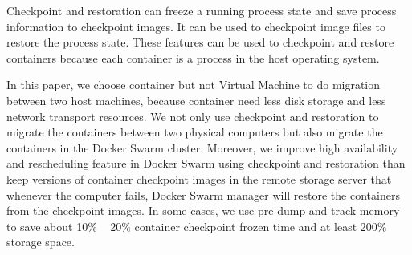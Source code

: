 Checkpoint and restoration can freeze a running process state and save process information to checkpoint images. It can be used to checkpoint image files to restore the process state. These features can be used to checkpoint and restore containers because each container is a process in the host operating system.

In this paper, we choose container but not Virtual Machine to do migration between two host machines, because container need less disk storage and less network transport resources. We not only use checkpoint and restoration to migrate the containers between two physical computers but also migrate the containers in the Docker Swarm cluster.
Moreover, we improve high availability and rescheduling feature in Docker Swarm using checkpoint and restoration than keep versions of container checkpoint images in the remote storage server that whenever the computer fails, Docker Swarm manager will restore the containers from the checkpoint images. In some cases, we use pre-dump and track-memory to save about 10\% ~ 20\% container checkpoint frozen time and at least 200\% storage space.
